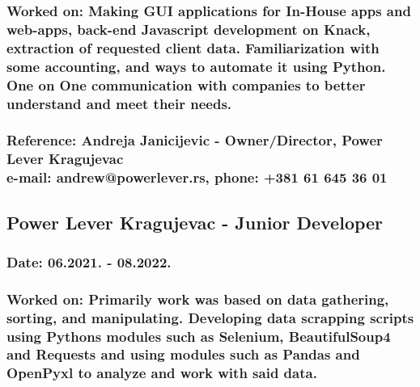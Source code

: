 \documentclass{article}
\begin{document}
	\subsubsection{\large{Worked on:}\normalsize{ Making GUI applications for In-House apps  and web-apps, back-end Javascript development on Knack, extraction of requested client data.
		Familiarization with some accounting, and ways to automate it using Python. One on One communication with companies to better understand and meet their needs.}}
	\subsubsection{\large{Reference: Andreja Janicijevic}\normalsize{ - Owner/Director, Power Lever Kragujevac\\e-mail: andrew@powerlever.rs, phone: +381 61 645 36 01}}
	\subsection{\large{Power Lever Kragujevac - Junior Developer}}
	\subsubsection{\large{Date:}\normalsize{ 06.2021. - 08.2022.}}
	\subsubsection{\large{Worked on:}\normalsize{ Primarily work was based on data gathering, sorting, and manipulating. Developing data scrapping scripts using Pythons modules such as 
	Selenium, BeautifulSoup4 and Requests and using modules such as Pandas and OpenPyxl to analyze and work with said data.}}

	
	
	
\end{document}
